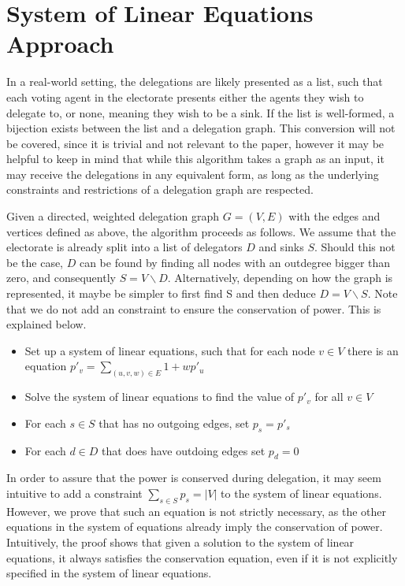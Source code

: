 

\section{System of Linear Equations Approach}

In a real-world setting, the delegations are likely presented as a list, such that each voting agent in the electorate presents either the agents they wish to delegate to, or none, meaning they wish to be a sink. If the list is well-formed, a bijection exists between the list and a delegation graph. This conversion will not be covered, since it is trivial and not relevant to the paper, however it may be helpful to keep in mind that while this algorithm takes a graph as an input, it may receive the delegations in any equivalent form, as long as the underlying constraints and restrictions of a delegation graph are respected. 

Given a directed, weighted delegation graph $G = (V, E)$ with the edges and vertices defined as above, the algorithm proceeds as follows. We assume that the electorate is already split into a list of delegators $D$ and sinks $S$. Should this not be the case, $D$ can be found by finding all nodes with an outdegree bigger than zero, and consequently $S = V \backslash D$. Alternatively, depending on how the graph is represented, it maybe be simpler to first find S and then deduce $D= V \backslash S$. Note that we do not add an constraint to ensure the conservation of power. This is explained below.

\begin{itemize}
\item Set up a system of linear equations, such that for each node $v \in V$ there is an equation $p'_v = \sum_{(u, v, w) \in E} 1 + wp'_u$
\item Solve the system of linear equations to find the value of $p'_v$ for all $v \in V$
\item For each $s \in S$ that has no outgoing edges, set $p_s = p'_s$
\item For each $d \in D$ that does have outdoing edges set $p_d = 0$
\end{itemize}

In order to assure that the power is conserved during delegation, it may seem intuitive to add a constraint $\sum_{s \in S} p_s = |V|$ to the system of linear equations. However, we prove that such an equation is not strictly necessary, as the other equations in the system of equations already imply the conservation of power. Intuitively, the proof shows that given a solution to the system of linear equations, it always satisfies the conservation equation, even if it is not explicitly specified in the system of linear equations.

